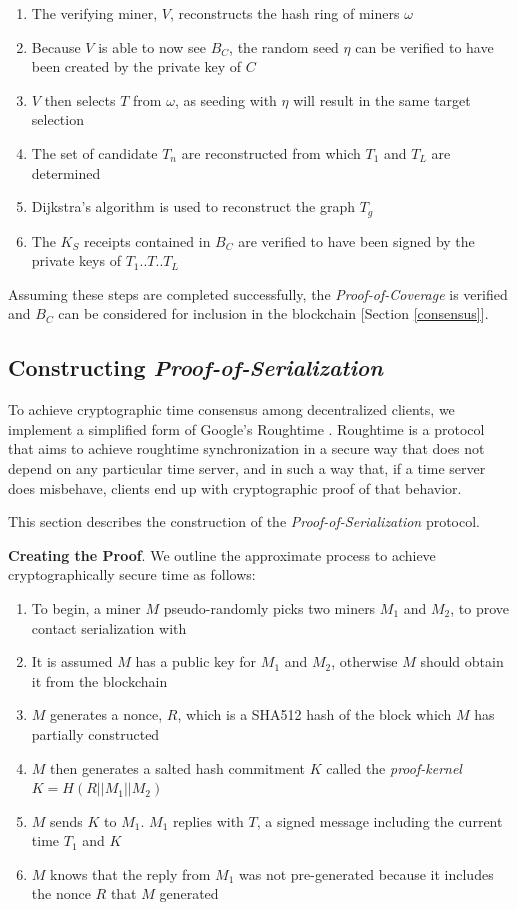 \documentclass[10pt, nonatbib, nocopyrightspace, reprint]{sigplanconf}
\begin{document}
\begin{enumerate}
        \item The verifying miner, $V$, reconstructs the hash ring of miners $\omega$
        \item Because $V$ is able to now see $B_C$, the random seed $\eta$ can be verified to have been created by the private key of $C$
        \item $V$ then selects $T$ from $\omega$, as seeding with $\eta$ will result in the same target selection
        \item The set of candidate $T_n$ are reconstructed from which $T_1$ and $T_L$ are determined
        \item Dijkstra's algorithm is used to reconstruct the graph $T_g$
        \item The $K_S$ receipts contained in $B_C$ are verified to have been signed by the private keys of $T_1$..$T$..$T_L$
\end{enumerate}

Assuming these steps are completed successfully, the \emph{Proof-of-Coverage} is verified and $B_C$ can be considered for inclusion in the blockchain [Section \ref{consensus}].

\subsection{Constructing \emph{Proof-of-Serialization}}

To achieve cryptographic time consensus among decentralized clients, we implement a simplified form of Google’s Roughtime \cite{roughtime}. Roughtime is a protocol that aims to achieve roughtime synchronization in a secure way that does not depend on any particular time server, and in such a way that, if a time server does misbehave, clients end up with cryptographic proof of that behavior.

This section describes the construction of the \emph{Proof-of-Serialization} protocol.

\textbf{Creating the Proof}. We outline the approximate process to achieve cryptographically secure time as follows:

\begin{enumerate}
        \item To begin, a miner $M$ pseudo-randomly picks two miners $M_1$ and $M_2$, to prove contact serialization with
        \item It is assumed $M$ has a public key for $M_1$ and $M_2$, otherwise $M$ should obtain it from the blockchain
        \item $M$ generates a nonce, $R$, which is a SHA512 hash of the block which $M$ has partially constructed
        \item $M$ then generates a salted hash commitment $K$ called the \emph{proof-kernel} ${K = H\left(R || M_1 || M_2\right)}$
        \item $M$ sends $K$ to $M_1$. $M_1$ replies with $T$, a signed message including the current time $T_1$ and $K$
        \item $M$ knows that the reply from $M_1$ was not pre-generated because it includes the nonce $R$ that $M$ generated
\end{enumerate}
\end{document}

